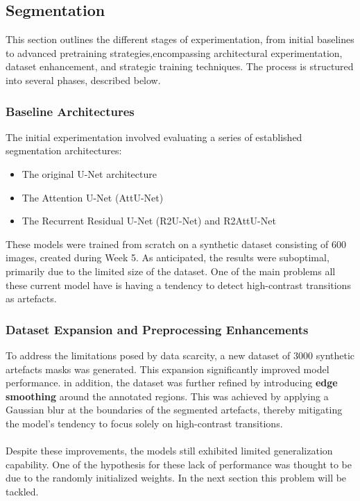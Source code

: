 \documentclass[openany, 12pt]{article}
\begin{document}
	\subsection{Segmentation}
	This section outlines the different stages of experimentation, from initial baselines to advanced pretraining strategies,encompassing architectural experimentation, dataset enhancement, and strategic training techniques. The process is structured into several phases, described below.
	\subsubsection*{Baseline Architectures}
	The initial experimentation involved evaluating a series of established segmentation architectures:
	\begin{itemize}
		\item The original U-Net architecture ~\cite{ronneberger_u-net_2015}
		\item The Attention U-Net (AttU-Net) ~\cite{oktay_attention_2018}
		\item The Recurrent Residual U-Net (R2U-Net) and R2AttU-Net ~\cite{alom_recurrent_2018}
	\end{itemize}
	These models were trained from scratch on a synthetic dataset consisting of 600 images, created during Week 5. As anticipated, the results were suboptimal, primarily due to the limited size of the dataset. One of the main problems all these current model have is having a tendency to detect high-contrast transitions as artefacts.
	\subsubsection*{Dataset Expansion and Preprocessing Enhancements}
	To address the limitations posed by data scarcity, a new dataset of 3000 synthetic artefacts masks was generated. This expansion significantly improved model performance. in addition, the dataset was further refined by introducing \textbf{edge smoothing} around the annotated regions. This was achieved by applying a Gaussian blur at the boundaries of the segmented artefacts, thereby mitigating the model's tendency to focus solely on high-contrast transitions.\\
	\\
	Despite these improvements, the models still exhibited limited generalization capability. One of the hypothesis for these lack of performance was thought to be due to the randomly initialized weights. In the next section this problem will be tackled.
\end{document}
